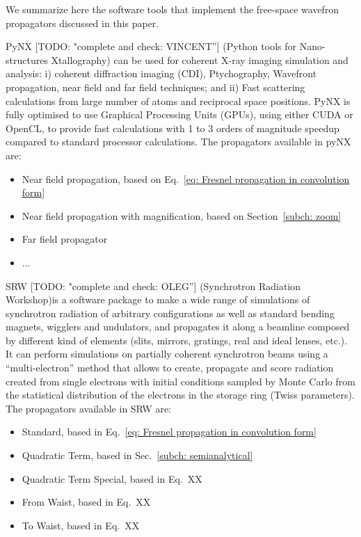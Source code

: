 \documentclass{iucr}              %
\newcommand{\todo}[1]{{\color{red}[TODO: "#1'']}}
\newcommand{\inred}[1]{{\color{red}#1}}
\begin{document}
We summarize here the software tools that implement the free-space wavefron propagators discussed in this paper. 

PyNX \todo{complete and check: VINCENT} \cite{Favre-Nicolin:hx5119} (Python tools for Nano-structures Xtallography) can be used for coherent X-ray imaging simulation and analysis: i) coherent diffraction imaging (CDI), Ptychography, Wavefront propagation, near field and far field techniques; and ii) Fast scattering calculations from large number of atoms and reciprocal space positions. PyNX is fully optimised to use Graphical Processing Units (GPUs), using either CUDA or OpenCL, to provide fast calculations with 1 to 3 orders of magnitude speedup compared to standard processor calculations. The propagators available in pyNX are: 
\begin{itemize}
    \item Near field propagation, based on Eq.~\ref{eq: Fresnel propagation in convolution form}
    \item Near field propagation with magnification, based on Section~\ref{subch: zoom}
    \item Far field propagator
    \item \inred{...}
\end{itemize}


SRW \todo{complete and check: OLEG} \cite{Chubar1998} (Synchrotron Radiation Workshop)is a software package to make a wide range of simulations of synchrotron radiation of arbitrary configurations as well as standard bending magnets, wigglers and undulators, and propagates it along a beamline composed by different kind of elements (slits, mirrors, gratings, real and ideal lenses, etc.). It can perform simulations on partially coherent synchrotron beams using a ``multi-electron'' method that allows to create, propagate and score radiation created from single electrons with initial conditions sampled by Monte Carlo from the statistical distribution of the electrons in the storage ring (Twiss parameters). The propagators available in SRW are: 
\begin{itemize}
    \item Standard, based in Eq.~\ref{eq: Fresnel propagation in convolution form}
    \item Quadratic Term, based in Sec.~\ref{subch: semianalytical}
    \item Quadratic Term Special, based in Eq.~XX
    \item From Waist, based in Eq.~XX
    \item To Waist, based in Eq.~XX
\end{itemize}
\end{document}
